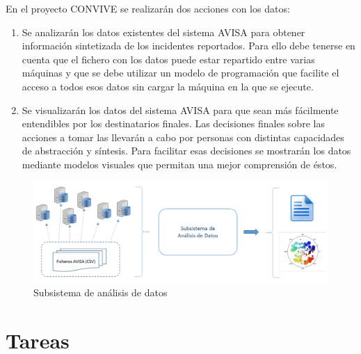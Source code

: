 \documentclass[
  a4paper,
]{scrreport}
\begin{document}
En el proyecto CONVIVE se realizarán dos acciones con los datos:

\begin{enumerate}
\def\labelenumi{\arabic{enumi}.}
\item
  Se analizarán los datos existentes del sistema AVISA para obtener
  información sintetizada de los incidentes reportados. Para ello debe
  tenerse en cuenta que el fichero con los datos puede estar repartido
  entre varias máquinas y que se debe utilizar un modelo de programación
  que facilite el acceso a todos esos datos sin cargar la máquina en la
  que se ejecute.
\item
  Se visualizarán los datos del sistema AVISA para que sean más
  fácilmente entendibles por los destinatarios finales. Las decisiones
  finales sobre las acciones a tomar las llevarán a cabo por personas
  con distintas capacidades de abstracción y síntesis. Para facilitar
  esas decisiones se mostrarán los datos mediante modelos visuales que
  permitan una mejor comprensión de éstos.
\end{enumerate}

\begin{figure}

{\centering \includegraphics{../img/convive/subsistema-analisis-datos.png}

}

\caption{Subsistema de análisis de datos}

\end{figure}

\hypertarget{tareas}{%
\section{Tareas}\label{tareas}}
\end{document}
